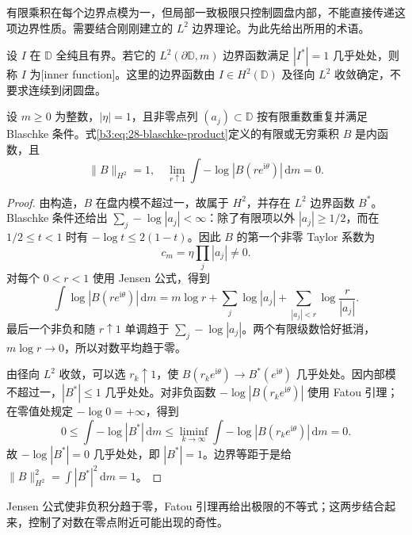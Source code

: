 \ProseParagraphBreak

有限乘积在每个边界点模为一，但局部一致极限只控制圆盘内部，不能直接传递这项边界性质。需要结合刚刚建立的 \(L^2\) 边界理论。为此先给出所用的术语。

\begin{definition}\label{b3:def:28-inner}
设 \(I\) 在 \(\mathbb D\) 全纯且有界。若它的 \(L^2(\partial\mathbb D,m)\) 边界函数满足 \(|I^*|=1\) 几乎处处，则称 \(I\) 为[inner function]。这里的边界函数由 \(I\in H^2(\mathbb D)\) 及径向 \(L^2\) 收敛确定，不要求连续到闭圆盘。
\end{definition}

\begin{theorem}\label{b3:thm:28-blaschke-inner}
设 \(m\ge0\) 为整数，\(|\eta|=1\)，且非零点列 \((a_j)\subset\mathbb D\) 按有限重数重复并满足 Blaschke 条件。式\eqref{b3:eq:28-blaschke-product}定义的有限或无穷乘积 \(B\) 是内函数，且
\[
 \|B\|_{H^2}=1,
 \quad
 \lim_{r\uparrow1}\int-\log|B(re^{\mathrm i\theta})|\,\mathrm dm=0.
\]
\end{theorem}
\begin{proof}
由构造，\(B\) 在盘内模不超过一，故属于 \(H^2\)，并存在 \(L^2\) 边界函数 \(B^*\)。Blaschke 条件还给出 \(\sum_j-\log|a_j|<\infty\)：除了有限项以外 \(|a_j|\ge1/2\)，而在 \(1/2\le t<1\) 时有 \(-\log t\le2(1-t)\)。因此 \(B\) 的第一个非零 Taylor 系数为
\[
 c_m=\eta\prod_j|a_j|\ne0.
\]
对每个 \(0<r<1\) 使用 Jensen 公式，得到
\[
 \int\log|B(re^{\mathrm i\theta})|\,\mathrm dm
 =m\log r+\sum_j\log|a_j|
             +\sum_{|a_j|<r}\log\frac r{|a_j|}.
\]
最后一个非负和随 \(r\uparrow1\) 单调趋于 \(\sum_j-\log|a_j|\)。两个有限级数恰好抵消，\(m\log r\to0\)，所以对数平均趋于零。

由径向 \(L^2\) 收敛，可以选 \(r_k\uparrow1\)，使 \(B(r_ke^{\mathrm i\theta})\to B^*(e^{\mathrm i\theta})\) 几乎处处。因内部模不超过一，\(|B^*|\le1\) 几乎处处。对非负函数 \(-\log|B(r_ke^{\mathrm i\theta})|\) 使用 Fatou 引理；在零值处规定 \(-\log0=+\infty\)，得到
\[
 0\le\int-\log|B^*|\,\mathrm dm
 \le\liminf_{k\to\infty}\int-\log|B(r_ke^{\mathrm i\theta})|\,\mathrm dm=0.
\]
故 \(-\log|B^*|=0\) 几乎处处，即 \(|B^*|=1\)。边界等距于是给 \(\|B\|_{H^2}^2=\int|B^*|^2\,\mathrm dm=1\)。
\end{proof}

Jensen 公式使非负积分趋于零，Fatou 引理再给出极限的不等式；这两步结合起来，控制了对数在零点附近可能出现的奇性。

\ProseParagraphBreak

